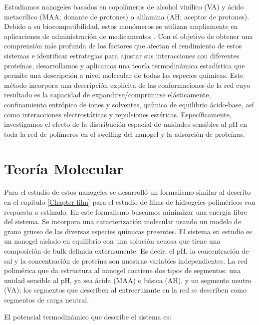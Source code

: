 Estudiamos nanogeles basados en copol\'imeros de alcohol vin\'ilico (VA) y \'acido metacr\'ilico (MAA; donante de protones) o alilamina (AH; aceptor de protones).
Debido a su biocompatibilidad, estos mon\'omeros se utilizan ampliamente en aplicaciones de administraci\'on de medicamentos \cite{asadi2020common,sarwar2020smart,lowman1999oral}.
Con el objetivo de obtener una comprensi\'on m\'as profunda de los factores que afectan el rendimiento de estos sistemas e identificar estrategias para ajustar sus interacciones con diferentes prote\'inas, desarrollamos y aplicamos una teor\'ia termodin\'amica estad\'istica que permite una descripci\'on a nivel molecular de todas las especies qu\'imicas.
Este m\'etodo incorpora una descripci\'on expl\'icita de las conformaciones de la red cuyo resultado es la capacidad de expandirse/comprimirse el\'asticamente, confinamiento entr\'opico de iones y solventes, qu\'imica de equilibrio \'acido-base, as\'i como interacciones electrost\'aticas y repulsiones est\'ericas.
Espec\'ificamente, investigamos el efecto de la distribuci\'on espacial de unidades sensibles al pH en toda la red de pol\'imeros en el swelling del nanogel y la adsorci\'on de prote\'inas.



\section{Teor\'ia Molecular}
Para el estudio de estos nanogeles se desarroll\'o un formalismo similar al descrito en el capitulo \ref{Chapter-film} para el estudio de films de hidrogeles polim\'ericos con respuesta a est\'imulo.
En este formalismo  buscamos minimizar una energ\'ia libre del sistema. Se incorpora una caracterizaci\'on molecular usando un modelo de grano grueso de las diversas especies qu\'imicas presentes.
El sistema en estudio es un nanogel aislado en equilibrio con una soluci\'on acuosa que tiene una composici\'on de bulk definida externamente.
Es decir, el pH, la concentraci\'on de sal y la concentraci\'on de prote\'ina son nuestras variables independientes.
La red polim\'erica que da estructura al nanogel contiene dos tipos de segmentos: una unidad sensible al pH, ya sea \'acida (MAA) o b\'asica (AH), y un segmento neutro (VA);
los segmentos que describen al entrecruzante en la red se describen como segmentos de carga neutral.

El potencial termodin\'amico que describe el sistema es:

